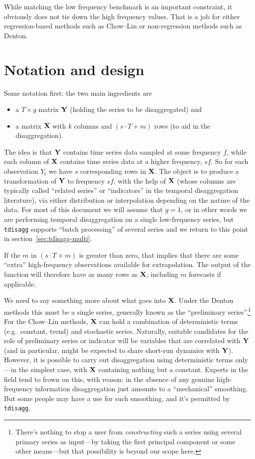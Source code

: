 While matching the low frequency benchmark is an important constraint,
it obviously does not tie down the high frequency values. That is a
job for either regression-based methods such as Chow--Lin or
non-regression methods such as Denton.

\section{Notation and design}
\label{sec:tdisagg-nd}

Some notation first: the two main ingredients are
\begin{itemize}
\item a $T \times g$ matrix $\mathbf{Y}$ (holding the series to be
  disaggregated) and
\item a matrix $\mathbf{X}$ with $k$ columns and $(s \cdot T + m)$ rows (to
  aid in the disaggregation).
\end{itemize}
The idea is that $\mathbf{Y}$ contains time series data sampled at some
frequency $f$, while each column of $\mathbf{X}$ contains time series data at
a higher frequency, $sf$. So for each observation $Y_t$ we have $s$
corresponding rows in $\mathbf{X}$. The object is to produce a transformation
of $\mathbf{Y}$ to frequency $sf$, with the help of $\mathbf{X}$ (whose columns are
typically called ``related series'' or ``indicators'' in the temporal
disaggregation literature), via either distribution or interpolation
depending on the nature of the data. For most of this document we will
assume that $g = 1$, or in other words we are performing temporal
disaggregation on a single low-frequency series, but \texttt{tdisagg}
supports ``batch processing'' of several series and we return to this
point in section~\ref{sec:tdisagg-multi}.

If the $m$ in $(s \cdot T + m)$ is greater than zero, that implies
that there are some ``extra'' high-frequency observations available
for extrapolation. The output of the function will therefore have as
many rows as $\mathbf{X}$, including $m$ forecasts if applicable.

We need to say something more about what goes into $\mathbf{X}$. Under the
Denton methods this must be a single series, generally known as the
``preliminary series''.\footnote{There's nothing to stop a user from
  \textit{constructing} such a series using several primary series as
  input---by taking the first principal component or some other
  means---but that possibility is beyond our scope here.} For the
Chow--Lin methods, $\mathbf{X}$ can hold a combination of deterministic terms
(e.g.\ constant, trend) and stochastic series. Naturally, suitable
candidates for the role of preliminary series or indicator will be
variables that are correlated with $\mathbf{Y}$ (and in particular, might be
expected to share short-run dynamics with $\mathbf{Y}$). However, it is
possible to carry out disaggregation using deterministic terms
only---in the simplest case, with $\mathbf{X}$ containing nothing but a
constant. Experts in the field tend to frown on this, with reason: in
the absence of any genuine high-frequency information disaggregation
just amounts to a ``mechanical'' smoothing. But some people may have a
use for such smoothing, and it's permitted by \texttt{tdisagg}.

